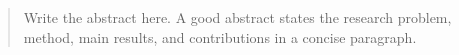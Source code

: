 \begin{abstract}
Write the abstract here. A good abstract states the research problem, method,
main results, and contributions in a concise paragraph.
\end{abstract}

